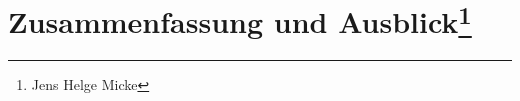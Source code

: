 \chapter[Zusammenfassung und Ausblick]{Zusammenfassung und Ausblick\footnote{Jens Helge Micke}}
\thispagestyle{fancy}
\label{Ausblick}
